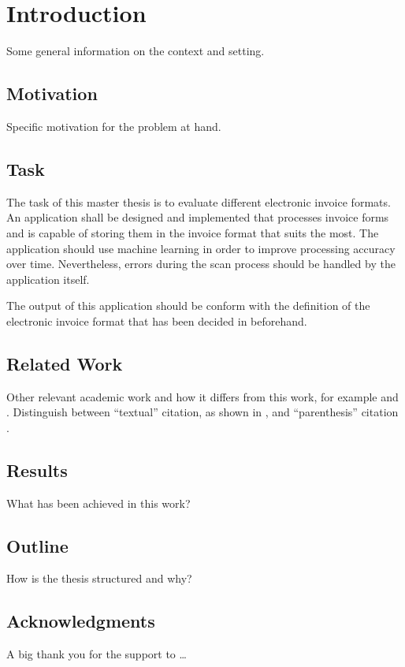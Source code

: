 %
% 


\chapter{Introduction}

Some general information on the context and setting. \blindtext{}

\Blindtext[2][2]

\section{Motivation}

Specific motivation for the problem at hand. \blindtext{}

\blindtext[2]

\section{Task}

The task of this master thesis is to evaluate different electronic invoice formats. 
An application shall be designed and implemented that processes invoice forms and is capable of storing them in the invoice format that suits the most.
The application should use machine learning in order to improve processing accuracy over time.
Nevertheless, errors during the scan process should be handled by the application itself.

The output of this application should be conform with the definition of the electronic invoice format that has been decided in beforehand.
\blindtext{}

\blindtext{}


\section{Related Work}

Other relevant academic work and how it differs from this work, for
example \citet{shannon_diff} and \citet{blowfish}. Distinguish between
``textual'' citation, as shown in \citet{shannon_diff}, and
``parenthesis'' citation \citep{blowfish}.

\Blindtext[3][1]


\section{Results}

What has been achieved in this work? \blindtext{}

\blindtext[2][1]

\section{Outline}

How is the thesis structured and why? \blindtext{}


\section{Acknowledgments}

A big thank you for the support to \ldots \blindtext

